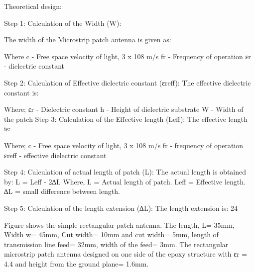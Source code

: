 \documentclass[12pt]{article}
\begin{document}
				                 Theoretical design:
				                 
				                 Step 1: Calculation of the Width (W):
				                  
				                 The width of the Microstrip patch antenna is given as: 
				                 					                                           
				                 Where
				                     c - Free space velocity of light, 3 x 108 m/s
				                 fr - Frequency of operation
				                 εr - dielectric constant
				                 
				                 Step 2: Calculation of Effective dielectric constant (εreff): 
				                 The effective dielectric constant is:
				                  		  
				                 Where;
				                        εr - Dielectric constant
				                 h - Height of dielectric substrate
				                 W - Width of the patch
				                 Step 3: Calculation of the Effective length (Leff):  
				                 The effective length is:
				                  					      
				                 Where;
				                  c - Free space velocity of light, 3 x 108 m/s
				                 fr - frequency of operation
				                 εreff - effective dielectric constant
				                 
				                 Step 4: Calculation of actual length of patch (L):  
				                 The actual length is obtained by:
				                 L = Leff - 2∆L					
				                 Where,
				                 L 	= Actual length of patch.
				                 Leff 	 = Effective length.
				                 ∆L 	= small difference between length.
				                 
				                 Step 5: Calculation of the length extension (∆L):  
				                 The length extension is:
				                 24
				                 
				                 Figure shows the simple rectangular patch antenna. 
				                 The length, L= 35mm, 
				                 Width w= 45mm,
				                 Cut width= 10mm 
				                 and cut width= 5mm, 
				                 length of transmission line feed= 32mm, 
				                 width of the feed= 3mm. 
				                 The rectangular microstrip patch antenna designed on one side of the epoxy structure with εr = 4.4 and height from the ground plane= 1.6mm. 
				                 
\end{document}
